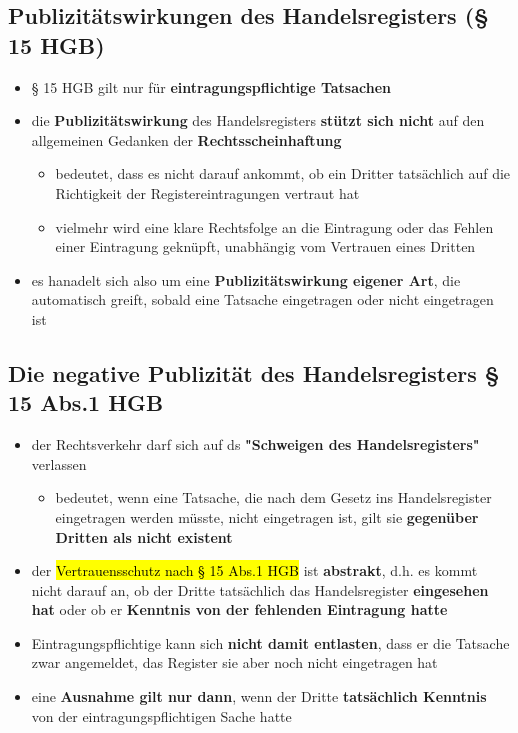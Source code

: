 \documentclass[a4paper, 10pt]{article}
\begin{document}
\subsection{Publizitätswirkungen des Handelsregisters (§ 15 HGB)}
\begin{itemize}
    \item § 15 HGB gilt nur für \textbf{eintragungspflichtige Tatsachen} 
    \item die \textbf{Publizitätswirkung} des Handelsregisters \textbf{stützt sich nicht} auf den allgemeinen Gedanken der \textbf{Rechtsscheinhaftung}
    \begin{itemize}
        \item bedeutet, dass es nicht darauf ankommt, ob ein Dritter tatsächlich auf die Richtigkeit der Registereintragungen vertraut hat
        \item vielmehr wird eine klare Rechtsfolge an die Eintragung oder das Fehlen einer Eintragung geknüpft, unabhängig vom Vertrauen eines Dritten
    \end{itemize}

    \item es hanadelt sich also um eine \textbf{Publizitätswirkung eigener Art}, die automatisch greift, sobald eine Tatsache eingetragen oder nicht eingetragen ist
\end{itemize}

\subsection{Die negative Publizität des Handelsregisters § 15 Abs.1 HGB}
\begin{itemize}
    \item der Rechtsverkehr darf sich auf ds \textbf{"Schweigen des Handelsregisters"} verlassen
    \begin{itemize}
        \item bedeutet, wenn eine Tatsache, die nach dem Gesetz ins Handelsregister eingetragen werden müsste, nicht eingetragen ist, gilt sie \textbf{gegenüber Dritten als nicht existent}
    \end{itemize}

    \item der \hl{Vertrauensschutz nach § 15 Abs.1 HGB} ist \textbf{abstrakt}, d.h. es kommt nicht darauf an, ob der Dritte tatsächlich das Handelsregister \textbf{eingesehen hat} oder ob er \textbf{Kenntnis von der fehlenden Eintragung hatte} 
    \item Eintragungspflichtige kann sich \textbf{nicht damit entlasten}, dass er die Tatsache zwar angemeldet, das Register sie aber noch nicht eingetragen hat
    \item eine \textbf{Ausnahme gilt nur dann}, wenn der Dritte \textbf{tatsächlich Kenntnis} von der eintragungspflichtigen Sache hatte
\end{itemize}
\end{document}
